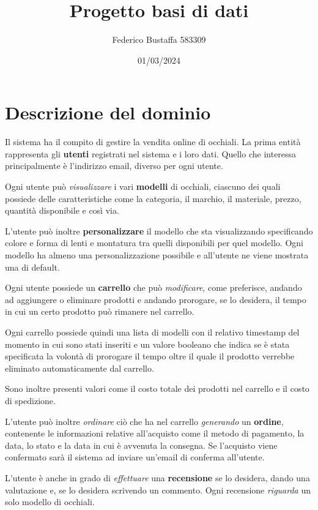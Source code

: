 \documentclass[12pt, a4paper]{article}
\title{Progetto basi di dati}
\author{Federico Bustaffa 583309}
\date{01/03/2024}
\begin{document}
\maketitle
\tableofcontents

\section{Descrizione del dominio}
Il sistema ha il compito di gestire la vendita online di occhiali. La prima entità rappresenta gli
\textbf{utenti} registrati nel sistema e i loro dati. Quello che interessa principalmente è
l'indirizzo email, diverso per ogni utente.

Ogni utente può \emph{visualizzare} i vari \textbf{modelli} di occhiali, ciascuno dei quali
possiede delle caratteristiche come la categoria, il marchio, il materiale, prezzo, quantità
disponibile e così via.

L'utente può inoltre \textbf{personalizzare} il modello che sta visualizzando specificando colore
e forma di lenti e montatura tra quelli disponibili per quel modello. Ogni modello ha almeno una
personalizzazione possibile e all'utente ne viene mostrata una di default.

Ogni utente possiede un \textbf{carrello} che può \emph{modificare}, come preferisce, andando ad
aggiungere o eliminare prodotti e andando prorogare, se lo desidera, il tempo in cui un certo
prodotto può rimanere nel carrello.

Ogni carrello possiede quindi una lista di modelli con il relativo timestamp del momento in cui
sono stati inseriti e un valore booleano che indica se è stata specificata la volontà di prorogare
il tempo oltre il quale il prodotto verrebbe eliminato automaticamente dal carrello.

Sono inoltre presenti valori come il costo totale dei prodotti nel carrello e il costo di
spedizione.

L'utente può inoltre \emph{ordinare} ciò che ha nel carrello \emph{generando} un \textbf{ordine},
contenente le informazioni relative all'acquisto come il metodo di pagamento, la data, lo stato e
la data in cui è avvenuta la consegna. Se l'acquisto viene confermato sarà il sistema ad inviare
un'email di conferma all'utente.

L'utente è anche in grado di \emph{effettuare} una \textbf{recensione} se lo desidera, dando una
valutazione e, se lo desidera scrivendo un commento. Ogni recensione \emph{riguarda} un solo
modello di occhiali.
\end{document}
